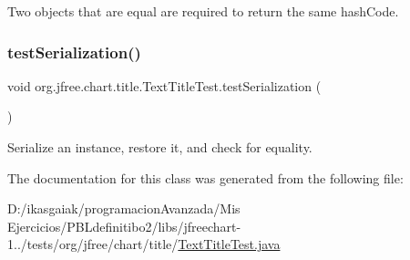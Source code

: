 Two objects that are equal are required to return the same hash\+Code. \mbox{\label{classorg_1_1jfree_1_1chart_1_1title_1_1_text_title_test_a656b9599d8cdfb6493ebb623dba35311}} 
\subsubsection{\texorpdfstring{test\+Serialization()}{testSerialization()}}
{\footnotesize\ttfamily void org.\+jfree.\+chart.\+title.\+Text\+Title\+Test.\+test\+Serialization (\begin{DoxyParamCaption}{ }\end{DoxyParamCaption})}

Serialize an instance, restore it, and check for equality. 

The documentation for this class was generated from the following file\+:\begin{DoxyCompactItemize}
\item 
D\+:/ikasgaiak/programacion\+Avanzada/\+Mis Ejercicios/\+P\+B\+Ldefinitibo2/libs/jfreechart-\/1../tests/org/jfree/chart/title/\mbox{\hyperlink{_text_title_test_8java}{Text\+Title\+Test.\+java}}\end{DoxyCompactItemize}
